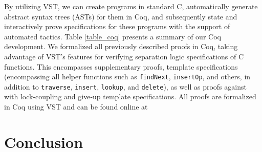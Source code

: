\documentclass[a4paper,UKenglish,cleveref, autoref, thm-restate]{lipics-v2021}
\begin{document}
By utilizing VST, we can create programs in standard C, automatically generate abstract syntax trees (ASTs) for them in Coq, and subsequently state and interactively prove specifications for these programs with the support of automated tactics. Table \ref{table_coq} presents a summary of our Coq development. We formalized all previously described proofs in Coq, taking advantage of VST's features for verifying separation logic specifications of C functions. This encompasses supplementary proofs, template specifications (encompassing all helper functions such as \texttt{findNext}, \texttt{insertOp}, and others, in addition to \texttt{traverse}, \texttt{insert}, \texttt{lookup}, and \texttt{delete}), as well as proofs against with lock-coupling and give-up template specifications. All proofs are formalized in Coq using VST and can be found online at

\href{https://github.com/PrincetonUniversity/DeepSpecDB/tree/master/concurrency/templates}{\color{blue}{https://github.com/PrincetonUniversity/DeepSpecDB/tree/master/concurrency/templates}}

\section{Conclusion}


\newpage




\end{document}
